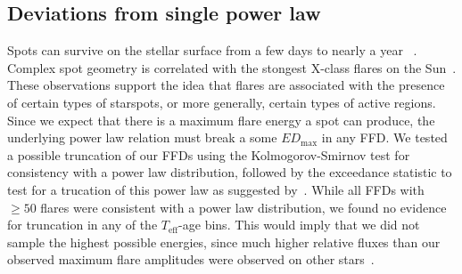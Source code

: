 \documentclass{aa}
\begin{document}
\subsection{Deviations from single power law}
Spots can survive on the stellar surface from a few days to nearly a year~
\citep{namekata_solarstellarwlf_2017, davenport_flaresandspots_2015}. Complex spot geometry is correlated with the stongest X-class flares on the Sun~\citep{toriumi_flaresspotssun_2017, sammis_deltaspotsflares_2000}. These observations support the idea that flares are associated with the presence of certain types of starspots, or more generally, certain types of active regions. Since we expect that there is a maximum flare energy a spot can produce, the underlying power law relation must break a some $ED_\mathrm{max}$ in any FFD. We tested a possible truncation of our FFDs using the Kolmogorov-Smirnov test for consistency with a power law distribution, followed by the exceedance statistic to test for a trucation of this power law as suggested by~\citet{maschberher2009}. While all FFDs with $\geqslant50$ flares were consistent with a power law distribution, we found no evidence for truncation in any of the $T_\mathrm{eff}$-age bins. This would imply that we did not sample the highest possible energies, since much higher relative fluxes than our observed maximum flare amplitudes were observed on other stars~\citep{paudel_monsterucdflare_2018, jackman_superflareucd_2019, schmidt_superflareasassn_2016}.
\end{document}
